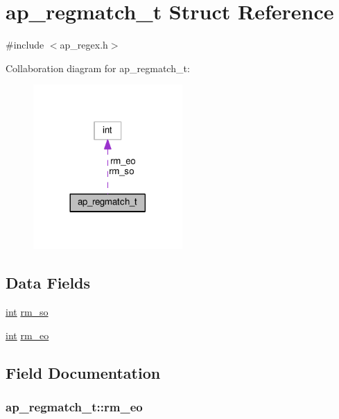 \hypertarget{structap__regmatch__t}{}\section{ap\+\_\+regmatch\+\_\+t Struct Reference}
\label{structap__regmatch__t}


{\ttfamily \#include $<$ap\+\_\+regex.\+h$>$}



Collaboration diagram for ap\+\_\+regmatch\+\_\+t\+:
\nopagebreak
\begin{figure}[H]
\begin{center}
\leavevmode
\includegraphics[width=161pt]{structap__regmatch__t__coll__graph}
\end{center}
\end{figure}
\subsection*{Data Fields}
\begin{DoxyCompactItemize}
\item 
\hyperlink{pcre_8txt_a42dfa4ff673c82d8efe7144098fbc198}{int} \hyperlink{structap__regmatch__t_a703711f7db759120836dbfbf1e795e7f}{rm\+\_\+so}
\item 
\hyperlink{pcre_8txt_a42dfa4ff673c82d8efe7144098fbc198}{int} \hyperlink{structap__regmatch__t_a8129e8cff55a25435bd8aa00d57da8d2}{rm\+\_\+eo}
\end{DoxyCompactItemize}


\subsection{Field Documentation}
\subsubsection[{\texorpdfstring{rm\+\_\+eo}{rm_eo}}]{ ap\+\_\+regmatch\+\_\+t\+::rm\+\_\+eo}\hypertarget{structap__regmatch__t_a8129e8cff55a25435bd8aa00d57da8d2}{}\label{structap__regmatch__t_a8129e8cff55a25435bd8aa00d57da8d2}
